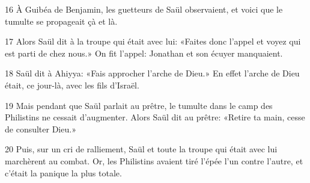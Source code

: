 
16 À Guibéa de Benjamin, les guetteurs de Saül observaient, et voici que le tumulte se propageait çà et là.

17 Alors Saül dit à la troupe qui était avec lui: «Faites donc l’appel et voyez qui est parti de chez nous.» On fit l’appel: Jonathan et son écuyer manquaient.

18 Saül dit à Ahiyya: «Fais approcher l’arche de Dieu.» En effet l’arche de Dieu était, ce jour-là, avec les fils d’Israël.

19 Mais pendant que Saül parlait au prêtre, le tumulte dans le camp des Philistins ne cessait d’augmenter. Alors Saül dit au prêtre: «Retire ta main, cesse de consulter Dieu.»

20 Puis, sur un cri de ralliement, Saül et toute la troupe qui était avec lui marchèrent au combat. Or, les Philistins avaient tiré l’épée l’un contre l’autre, et c’était la panique la plus totale.